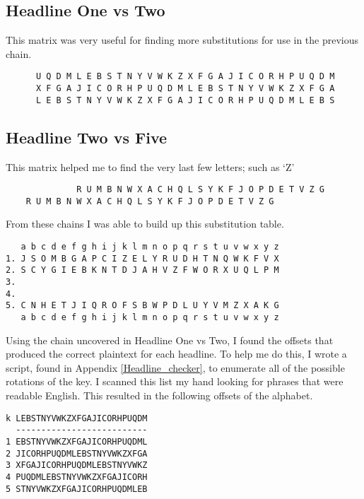 \documentclass[11pt,a4paper,twoside]{article}
\begin{document}
\subsection{Headline One vs Two}
This matrix was very useful for finding more substitutions for use in the
previous chain. 
\begin{lstlisting}
      U Q D M L E B S T N Y V W K Z X F G A J I C O R H P U Q D M
      X F G A J I C O R H P U Q D M L E B S T N Y V W K Z X F G A 
      L E B S T N Y V W K Z X F G A J I C O R H P U Q D M L E B S       
\end{lstlisting}

\subsection{Headline Two vs Five}
This matrix helped me to find the very last few letters; such as `Z'  
\begin{lstlisting}
              R U M B N W X A C H Q L S Y K F J O P D E T V Z G 
    R U M B N W X A C H Q L S Y K F J O P D E T V Z G
\end{lstlisting}


From these chains I was able to build up this substitution table.
\begin{lstlisting}
   a b c d e f g h i j k l m n o p q r s t u v w x y z
1. J S O M B G A P C I Z E L Y R U D H T N Q W K F V X 
2. S C Y G I E B K N T D J A H V Z F W O R X U Q L P M 
3.                                                     
4.                                                     
5. C N H E T J I Q R O F S B W P D L U Y V M Z X A K G 
   a b c d e f g h i j k l m n o p q r s t u v w x y z
\end{lstlisting}

\pagebreak

Using the chain uncovered in Headline One vs Two, I found the offsets that
produced the correct plaintext for each headline. To help me do this, I wrote a
script, found in Appendix \ref{Headline_checker}, to enumerate all of the
possible rotations of the key. I scanned this list my hand looking for phrases
that were readable English. This resulted in the following offsets of the
alphabet. 

\begin{lstlisting}
k LEBSTNYVWKZXFGAJICORHPUQDM
  --------------------------
1 EBSTNYVWKZXFGAJICORHPUQDML
2 JICORHPUQDMLEBSTNYVWKZXFGA
3 XFGAJICORHPUQDMLEBSTNYVWKZ
4 PUQDMLEBSTNYVWKZXFGAJICORH
5 STNYVWKZXFGAJICORHPUQDMLEB
\end{lstlisting}
\end{document}
